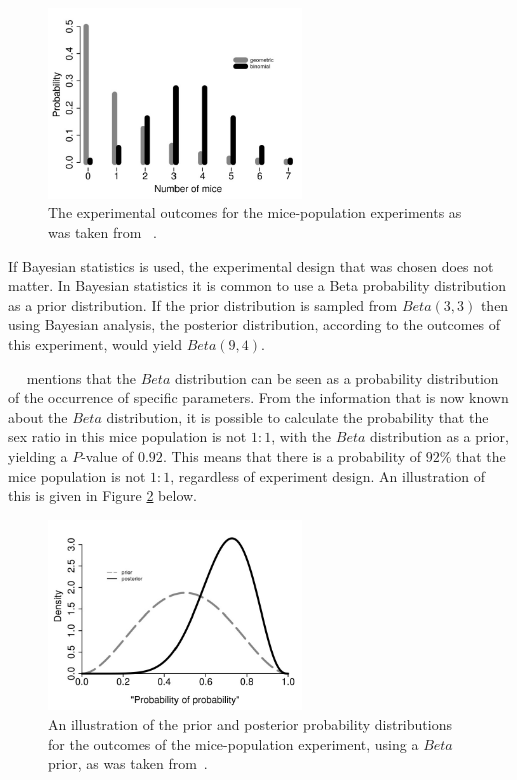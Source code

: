 \begin{figure}[htbp]
      \centering
      \includegraphics[width=0.6\textwidth]{images/mouse_experiment_outcome.pdf}
      \caption{The experimental outcomes for the mice-population experiments as was taken from~\cite{ref:hackenberger:2019} .}
      \label{fig:probability:bayesian_statistics:mouse_experiment_outcome}
\end{figure}

\noindent
If Bayesian statistics is used, the experimental design that was chosen does not matter. In Bayesian statistics it is common to use a Beta probability distribution as a prior distribution. If the prior distribution is sampled from $Beta(3,3)$ then using Bayesian analysis, the posterior distribution, according to the outcomes of this experiment, would yield $Beta(9,4)$.

~\citeauthor{ref:hackenberger:2019}~\cite{ref:hackenberger:2019} mentions that the $Beta$ distribution can be seen as a probability distribution of the occurrence of specific parameters. From the information that is now known about the $Beta$ distribution, it is possible to calculate the probability that the sex ratio in this mice population is not $1:1$, with the $Beta$ distribution as a prior, yielding a $P$-value of $0.92$. This means that there is a probability of $92\%$ that the mice population is not $1:1$, regardless of experiment design. An illustration of this is given in Figure \ref{fig:probability:bayesian_statistics:mouse_distributions} below.

\begin{figure}[htbp]
      \centering
      \includegraphics[width=0.6\textwidth]{images/mouse_experiment_distributions.pdf}
      \caption{An illustration of the prior and posterior probability distributions for the outcomes of the mice-population experiment, using a $Beta$ prior, as was taken from~\cite{ref:hackenberger:2019}.}
      \label{fig:probability:bayesian_statistics:mouse_distributions}
\end{figure}

